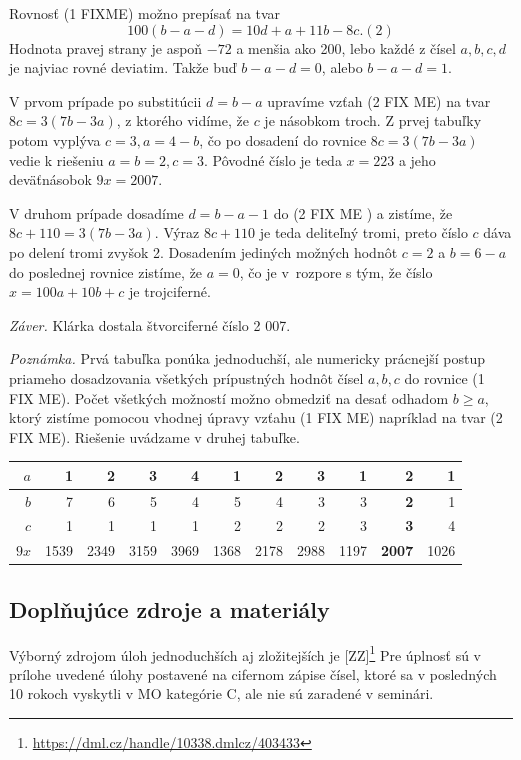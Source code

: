 \documentclass[11pt,a4paper,oneside,final]{book}
\begin{document}
Rovnosť (1 FIXME) možno prepísať na tvar
$$ 100(b - a - d) = 10d + a + 11b - 8c. (2)$$
Hodnota pravej strany je aspoň $-72$ a menšia ako 200, lebo každé z čísel $a, b, c, d$ je najviac rovné deviatim. Takže buď $b - a - d = 0$, alebo $b - a - d = 1$.

V prvom prípade po substitúcii $d = b - a$ upravíme vzťah (2 FIX ME) na tvar $8c = 3(7b - 3a)$, z ktorého vidíme, že $c$ je násobkom troch. Z prvej tabuľky potom vyplýva $c = 3, a = 4 - b$, čo po dosadení do rovnice $8c = 3(7b - 3a)$ vedie k riešeniu $a = b = 2, c = 3$. Pôvodné číslo je teda $x = 223$ a jeho deväťnásobok $9x = 2 007.$

V druhom prípade dosadíme $d = b - a - 1$ do (2 FIX ME ) a zistíme, že $8c + 110 = 3(7b-3a)$. Výraz $8c+110$ je teda deliteľný tromi, preto číslo $c$ dáva po delení tromi zvyšok 2. Dosadením jediných možných hodnôt $c = 2$ a $b = 6 - a$ do poslednej rovnice zistíme, že $a = 0$, čo je v~rozpore s tým, že číslo $x = 100a + 10b + c$ je trojciferné.

\textit{Záver.} Klárka dostala štvorciferné číslo 2 007.

\textit{Poznámka.} Prvá tabuľka ponúka jednoduchší, ale numericky prácnejší postup priameho dosadzovania všetkých prípustných hodnôt čísel $a, b, c$ do rovnice (1 FIX ME). Počet všetkých možností možno obmedziť na desať odhadom $b \geq a$, ktorý zistíme pomocou vhodnej úpravy vzťahu (1 FIX ME) napríklad na tvar (2 FIX ME). Riešenie uvádzame v druhej tabuľke.
\begin{center}
\begin{tabular}{|r||r|r|r|r|r|r|r|r|r|r|}
\hline
$a$ & 1 & 2 & 3 & 4 & 1 & 2 & 3 & 1 & \textbf{2} & 1\\
\hline
$b$ & 7 & 6 & 5 & 4 & 5 & 4 & 3 & 3 & \textbf{2} & 1 \\
\hline
$c$ & 1 & 1 & 1 & 1 & 2 & 2 & 2 & 3 & \textbf{3} & 4 \\
\hline
$9x$ & 1539 & 2349 & 3159 & 3969 & 1368 & 2178 & 2988 & 1197 & \textbf{2007} & 1026\\
\hline
\end{tabular}
\end{center}
\subsection*{Doplňujúce zdroje a materiály}
Výborný zdrojom úloh jednoduchších aj zložitejších je [ZZ]\footnote{\url{https://dml.cz/handle/10338.dmlcz/403433}} Pre úplnosť sú v prílohe uvedené úlohy postavené na cifernom zápise čísel, ktoré sa v posledných 10 rokoch vyskytli v MO kategórie C, ale nie sú zaradené v seminári.
\end{document}

